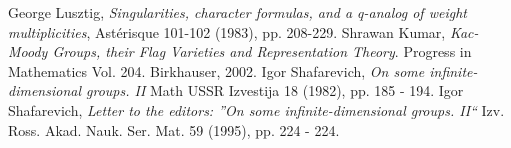 \documentclass[12pt]{article}
\begin{document}

\begin{thebibliography}{1}
 George Lusztig, \emph{Singularities, character formulas,
    and a q-analog of weight multiplicities}, Ast\'erisque 101-102 (1983), pp. 208-229.
 Shrawan Kumar, \emph{Kac-Moody Groups, their Flag Varieties and Representation Theory}. Progress in Mathematics Vol. 204. Birkhauser, 2002.
 Igor Shafarevich, \emph{On some infinite-dimensional groups. II} Math USSR Izvestija 18 (1982), pp. 185 - 194.
 Igor Shafarevich, \emph{Letter to the editors: ''On some infinite-dimensional groups. II``} Izv. Ross. Akad. Nauk. Ser. Mat. 59 (1995), pp. 224 - 224.
\end{thebibliography}
\end{document}
